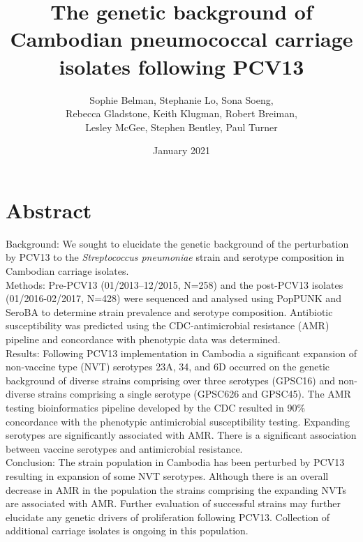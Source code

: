 \documentclass{article}
\title{The genetic background of Cambodian pneumococcal carriage isolates following PCV13}
\author{Sophie Belman, Stephanie Lo, Sona Soeng, 
\\Rebecca Gladstone, Keith Klugman, Robert Breiman, 
\\Lesley McGee, Stephen Bentley, Paul Turner}
\date{January 2021}
\begin{document}
\maketitle
\section{Abstract}
Background: We sought to elucidate the genetic background of the perturbation by PCV13 to the \textit{Streptococcus pneumoniae} strain and serotype composition in Cambodian carriage isolates.
\\Methods: Pre-PCV13 (01/2013–12/2015, N=258) and the post-PCV13 isolates (01/2016-02/2017, N=428) were sequenced and analysed using PopPUNK and SeroBA to determine strain prevalence and serotype composition. Antibiotic susceptibility was predicted using the CDC-antimicrobial resistance (AMR) pipeline and concordance with phenotypic data was determined.
\\Results: Following PCV13 implementation in Cambodia a significant expansion of non-vaccine type (NVT) serotypes 23A, 34, and 6D occurred on the genetic background of diverse strains comprising over three serotypes  (GPSC16) and non-diverse strains comprising a single serotype (GPSC626 and GPSC45). The AMR testing bioinformatics pipeline developed by the CDC resulted in 90\% concordance with the phenotypic antimicrobial susceptibility testing. Expanding serotypes are significantly associated with AMR. There is a significant association between vaccine serotypes and antimicrobial resistance.
\\Conclusion: The strain population in Cambodia has been perturbed by PCV13 resulting in expansion of some NVT serotypes. Although there is an overall decrease in AMR in the population the strains comprising the expanding NVTs are associated with AMR. Further evaluation of successful strains may further elucidate any genetic drivers of proliferation following PCV13. Collection of additional carriage isolates is ongoing in this population.
\end{document}
